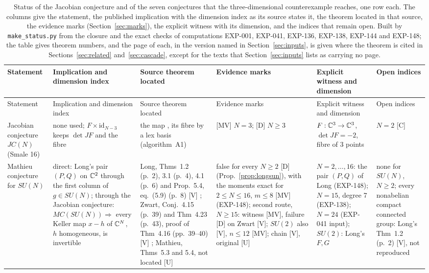 \clearpage
\begin{landscape}
\footnotesize
\setlength{\tabcolsep}{3pt}
\begin{longtable}{@{}L{0.11\textheight}L{0.17\textheight}L{0.19\textheight}L{0.14\textheight}L{0.19\textheight}L{0.12\textheight}@{}}
\caption{Status of the Jacobian conjecture and of the seven conjectures that the three-dimensional counterexample reaches, one row each. The columns give the statement, the published implication with the dimension index as its source states it, the theorem located in that source, the evidence marks (Section~\ref{sec:marks}), the explicit witness with its dimension, and the indices that remain open. Built by \texttt{make\_status.py} from the closure and the exact checks of computations EXP-001, EXP-041, EXP-136, EXP-138, EXP-144 and EXP-148; the table gives theorem numbers, and the page of each, in the version named in Section~\ref{sec:inputs}, is given where the theorem is cited in Sections~\ref{sec:related} and~\ref{sec:cascade}, except for the texts that Section~\ref{sec:inputs} lists as carrying no page.}\label{tab:status}\\
\toprule
Statement & Implication and dimension index & Source theorem located & Evidence marks & Explicit witness and dimension & Open indices \\
\midrule
\endfirsthead
\toprule
Statement & Implication and dimension index & Source theorem located & Evidence marks & Explicit witness and dimension & Open indices \\
\midrule
\endhead
\bottomrule
\endfoot
Jacobian conjecture $JC(N)$ (Smale 16) & none used; $F\times\mathrm{id}_{N-3}$ keeps $\det JF$ and the fibre & the map \cite{Alpoge2026}, its fibre by a lex basis (algorithm~A1) & [MV] $N=3$; [D] $N\ge3$ & $F:\mathbb{C}^3\to\mathbb{C}^3$, $\det JF=-2$, fibre of 3 points & $N=2$ [C] \\[3pt]
Mathieu conjecture for $SU(N)$ & direct: Long's pair $(P,Q)$ on $\mathbb{C}^2$ through the first column of $g\in SU(N)$; through the Jacobian conjecture: $MC(SU(N))\Rightarrow$ every Keller map $x-h$ of $\mathbb{C}^N$, $h$ homogeneous, is invertible & Long, Thms~1.2 (p.~2), 3.1 (p.~4), 4.1 (p.~6) and Prop.~5.4, eq.~(5.9) (p.~8) [V] \cite{LongMathieu2026}; Zwart, Conj.~4.15 (p.~39) and Thm~4.23 (p.~43), proof of Thm~4.16 (pp.~39--40) [V] \cite{Zwart2025}; Mathieu, Thms~5.3 and 5.4, not located [U] \cite{Mathieu1997} & false for every $N\ge2$ [D] (Prop.~\ref{prop:longsun}), with the moments exact for $2\le N\le16$, $m\le8$ [MV] (EXP-148); second route, $N\ge15$: witness [MV], failure [D] on Zwart [V]; $SU(2)$ also [V], $n\le12$ [MV]; chain [V], original [U] & $N=2,\dots,16$: the pair $(P,Q)$ of Long (EXP-148); $N=15$, degree 7 (EXP-138); $N=24$ (EXP-041 input); $SU(2)$: Long's $F,G$ \cite{LongSU2} & none for $SU(N)$, $N\ge2$; every nonabelian compact connected group: Long's Thm~1.2 (p.~2) [V], not reproduced \\[3pt]

\end{longtable}
\end{landscape}
